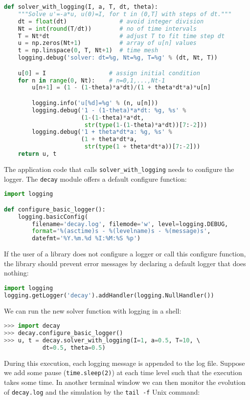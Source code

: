\documentclass[graybox,sectrefs,envcountresetchap,open=right,final]{svmonodo}
\begin{document}
\begin{lstlisting}[language=Python,style=blue1_bluegreen]
def solver_with_logging(I, a, T, dt, theta):
    """Solve u'=-a*u, u(0)=I, for t in (0,T] with steps of dt."""
    dt = float(dt)               # avoid integer division
    Nt = int(round(T/dt))        # no of time intervals
    T = Nt*dt                    # adjust T to fit time step dt
    u = np.zeros(Nt+1)           # array of u[n] values
    t = np.linspace(0, T, Nt+1)  # time mesh
    logging.debug('solver: dt=%g, Nt=%g, T=%g' % (dt, Nt, T))

    u[0] = I                  # assign initial condition
    for n in range(0, Nt):    # n=0,1,...,Nt-1
        u[n+1] = (1 - (1-theta)*a*dt)/(1 + theta*dt*a)*u[n]

        logging.info('u[%d]=%g' % (n, u[n]))
        logging.debug('1 - (1-theta)*a*dt: %g, %s' %
                      (1-(1-theta)*a*dt,
                       str(type(1-(1-theta)*a*dt))[7:-2]))
        logging.debug('1 + theta*dt*a: %g, %s' %
                      (1 + theta*dt*a,
                       str(type(1 + theta*dt*a))[7:-2]))
    return u, t
\end{lstlisting}
The application code that calls \Verb!solver_with_logging! needs to configure
the logger. The \texttt{decay} module offers a default configure function:

\begin{lstlisting}[language=Python,style=blue1_bluegreen]
import logging

def configure_basic_logger():
    logging.basicConfig(
        filename='decay.log', filemode='w', level=logging.DEBUG,
        format='%(asctime)s - %(levelname)s - %(message)s',
        datefmt='%Y.%m.%d %I:%M:%S %p')
\end{lstlisting}
If the user of a library does not configure a logger or call this
configure function, the library should prevent error messages by
declaring a default logger that does nothing:

\begin{lstlisting}[language=Python,style=blue1_bluegreen]
import logging
logging.getLogger('decay').addHandler(logging.NullHandler())
\end{lstlisting}

We can run the new solver function with logging in a shell:

\begin{lstlisting}[language=Python,style=blue1_bluegreen]
>>> import decay
>>> decay.configure_basic_logger()
>>> u, t = decay.solver_with_logging(I=1, a=0.5, T=10, \ 
           dt=0.5, theta=0.5)
\end{lstlisting}
During this execution, each logging message is appended to the log file.
Suppose we add some pause (\texttt{time.sleep(2)}) at each time level such that
the execution takes some time. In another terminal window we can then
monitor the evolution of \texttt{decay.log} and the simulation
by the \texttt{tail -f} Unix command:
\end{document}
